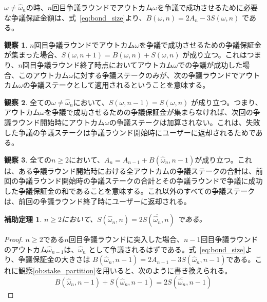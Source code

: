 \documentclass[floatfix,reprint,nofootinbib,amsmath,amssymb,epsfig,pre,floats,letterpaper,groupedaffiliation]{revtex4-1}
\newcommand{\beq}{\begin{equation}}
\newcommand{\eeq}{\end{equation}}
\newtheorem{lemma}[theorem]{補助定理}
\theoremstyle{definition}
\newtheorem{observation}{観察}
\theoremstyle{definition}
\theoremstyle{definition}
\begin{document}
\begin{appendix}
$\omega \neq \hat{\omega}_{n}$の時、$n$回目争議ラウンドでアウトカム$\omega$を争議で成功させるために必要な争議保証金額は、式~\ref{eq:bond_size}より、$B(\omega,n) = 2A_{n} - 3S(\omega,n)$ である。

\begin{observation}\label{ob:only_successfull_bond_stake_applies_v1}
$n$回目争議ラウンドでアウトカム$\omega$を争議で成功させるための争議保証金が集まった場合、$S(\omega,n+1)=B(\omega,n)+S(\omega,n)$ が成り立つ。これはつまり、$n$回目争議ラウンド終了時点においてアウトカム$\omega$での争議が成功した場合、このアウトカム$\omega$に対する争議ステークのみが、次の争議ラウンドでアウトカム$\omega$の争議ステークとして適用されるということを意味する。
\end{observation}

\begin{observation}\label{ob:only_successfull_bond_stake_applies_v2}
全ての$\omega \neq \hat{\omega}_{n}$において、$S(\omega,n-1)=S(\omega,n)$ が成り立つ。つまり、アウトカム$\omega$を争議で成功させるための争議保証金が集まらなければ、次回の争議ラウンド開始時にアウトカム$\omega$の争議ステークは加算されない。これは、失敗した争議の争議ステークは争議ラウンド開始時にユーザーに返却されるためである。
\end{observation}

\begin{observation}\label{ob:only_successfull_bond_stake_applies_v3}
全ての$n \geq 2$において、$A_{n} = A_{n-1} + B(\hat{\omega}_{n},n-1)$が成り立つ。これは、ある争議ラウンド開始時における全アウトカムの争議ステークの合計は、前回の争議ラウンド開始時の争議ステークの合計とその争議ラウンドで争議に成功した争議保証金の和であることを意味する。これ以外のすべての争議ステークは、前回の争議ラウンド終了時にユーザーに返却される。
\end{observation}

\begin{lemma}\label{le:tentative_outcomes_are_a_third_of_all_stake}
$n \geq 2$において、$S(\hat{\omega}_{n},n) = 2S(\overline{\hat{\omega}_{n}},n)$ である。
\end{lemma}

\begin{proof}
$n \geq 2$である$n$回目争議ラウンドに突入した場合、$n-1$回目争議ラウンドのアウトカム$\hat{\omega}_{n-1}$は、$\hat{\omega}_{n}$ として争議されるはずである。式~\ref{eq:bond_size}より、争議保証金の大きさは $B(\hat{\omega}_{n},n-1) = 2A_{n-1} - 3S(\hat{\omega}_{n},n-1)$である。これに観察\ref{ob:stake_partition}を用いると、次のように書き換えられる。
\beq \label{eq:bond_size_stake_partition}
B(\hat{\omega}_{n},n-1) + S(\hat{\omega}_{n},n-1) = 2S(\overline{\hat{\omega}_{n}},n-1)
\eeq


\end{proof}
\end{appendix}
\end{document}
